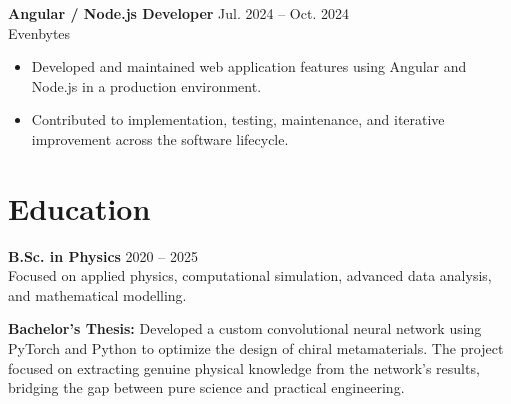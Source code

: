 \documentclass[11pt,a4paper]{article}
\begin{document}
\textbf{Angular / Node.js Developer} \hfill Jul. 2024 -- Oct. 2024\\
Evenbytes
\begin{itemize}
\item Developed and maintained web application features using Angular and Node.js in a production environment.
\item Contributed to implementation, testing, maintenance, and iterative improvement across the software lifecycle.
\end{itemize}

\section*{Education}

\textbf{B.Sc. in Physics} \hfill 2020 -- 2025\\
Focused on applied physics, computational simulation, advanced data analysis, and mathematical modelling.

\textbf{Bachelor's Thesis:} Developed a custom convolutional neural network using PyTorch and Python to optimize the design of chiral metamaterials. The project focused on extracting genuine physical knowledge from the network's results, bridging the gap between pure science and practical engineering.
\end{document}
